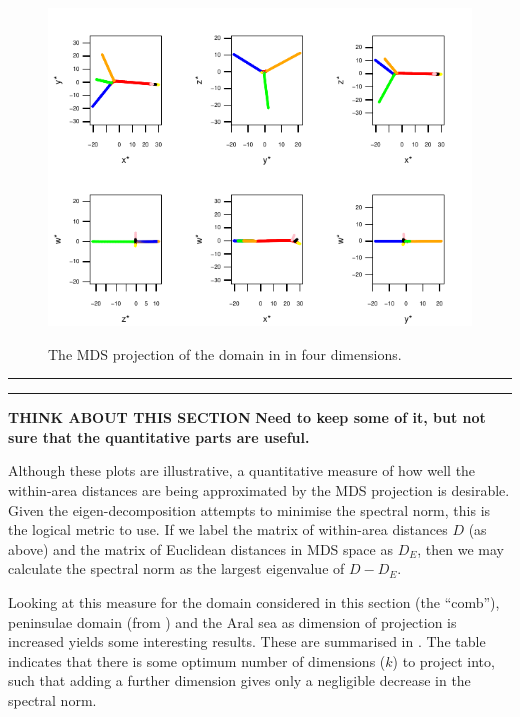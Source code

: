 {\begin{figure}
\centering
\includegraphics[width=6in]{mds/figs/comb-4d.pdf} \\
\caption{The MDS projection of the domain in  in four dimensions.}
\label{mds-comb-4d}
\end{figure}


\rule{6in}{1pt}

\rule{6in}{1pt}

\textbf{THINK ABOUT THIS SECTION}
\textbf{Need to keep some of it, but not sure that the quantitative parts are useful.}


Although these plots are illustrative, a quantitative measure of how well the within-area distances are being approximated by the MDS projection is desirable. Given the eigen-decomposition attempts to minimise the spectral norm, this is the logical metric to use. If we label the matrix of within-area distances $D$ (as above) and the matrix of Euclidean distances in MDS space as $D_E$, then we may calculate the spectral norm as the largest eigenvalue of $D-D_E$.

Looking at this measure for the domain considered in this section (the ``comb''), peninsulae domain (from ) and the Aral sea as dimension of projection is increased yields some interesting results. These are summarised in . The table indicates that there is some optimum number of dimensions ($k$) to project into, such that adding a further dimension gives only a negligible decrease in the spectral norm. 

}
